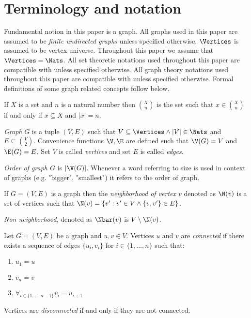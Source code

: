 
\section{Terminology and notation}

Fundamental notion in this paper is a graph. All graphs used in this paper are assumed to be \emph{finite undirected graphs} unless specified otherwise. $\Vertices$ is assumed to be vertex universe. Throughout this paper we assume that $\Vertices = \Nats$. All set theoretic notations used throughout this paper are compatible with \cite{jech} unless specified otherwise. All graph theory notations used throughout this paper are compatible with \cite{bollobas} unless specified otherwise. Formal definitions of some graph related concepts follow below.

\begin{defi}
    If $X$ is a set and $n$ is a natural number then $\binom{X}{n}$ is the set such that $x \in \binom{X}{n}$ if and only if $x \subseteq X$ and $|x| = n$.
\end{defi}

\begin{defi}
    \emph{Graph} $G$ is a tuple $(V,E)$ such that $V \subseteq \Vertices \land |V| \in \Nats$ and $E \subseteq \binom{V}{2}$. Convenience functions $\V, \E$ are defined such that $\V(G) = V$ and $\E(G) = E$. Set $V$ is called \emph{vertices} and set $E$ is called \emph{edges}.
\end{defi}

\begin{defi}
    \emph{Order of graph $G$} is $|\V(G)|$. Whenever a word referring to size is used in context of graphs (e.g. "bigger", "smallest") it refers to the order of graph.
\end{defi}

\begin{defi}
    If $G = (V,E)$ is a graph then the \emph{neighborhood of vertex $v$} denoted as $\N(v)$ is a set of vertices such that $\N(v) = \{v' : v' \in V \land \{v, v'\} \in E\}$.

    \emph{Non-neighborhood}, denoted as $\Nbar(v)$ is $V \setminus \N(v)$.
\end{defi}

\begin{defi}
    Let $G = (V,E)$ be a graph and $u, v \in V$. Vertices $u$ and $v$ are \emph{connected} if there exists a sequence of edges $\{u_i,v_i\}$ for $i \in \{1, \ldots, n\}$ such that:
    \begin{enumerate}
        \item $u_1 = u$
        \item $v_n = v$
        \item $\forall_{i \in \{1, \ldots, n - 1\}} v_i = u_{i+1}$
    \end{enumerate}

    Vertices are \emph{disconnected} if and only if they are not connected.
\end{defi}

